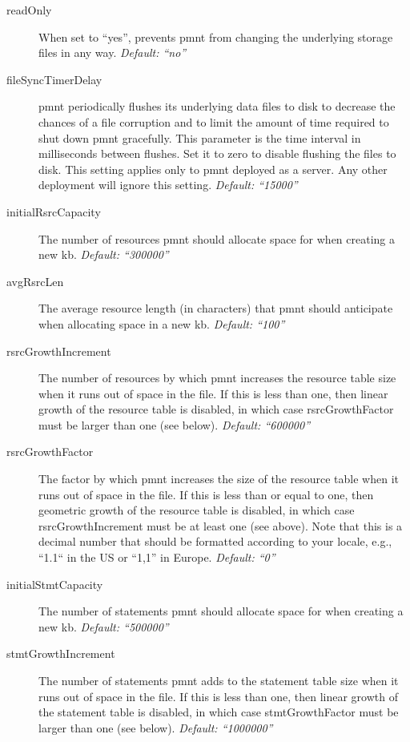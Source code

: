 \begin{description}
	\item[readOnly] When set to ``yes'', prevents \ac{pmnt} from changing the underlying storage files in any way. \emph{Default: ``no''}

	\item[fileSyncTimerDelay] \ac{pmnt} periodically flushes its underlying data files to disk to decrease the chances of a file corruption and to limit the amount of time required to shut down \ac{pmnt} gracefully.  This parameter is the time interval in milliseconds between flushes.  Set it to zero to disable flushing the files to disk.  This setting applies only to \ac{pmnt} deployed as a server.  Any other deployment will ignore this setting. \emph{Default: ``15000''}

	\item[initialRsrcCapacity] The number of resources \ac{pmnt} should allocate space for when creating a new \ac{kb}. \emph{Default: ``300000''}

	\item[avgRsrcLen] The average resource length (in characters) that \ac{pmnt} should anticipate when allocating space in a new \ac{kb}. \emph{Default: ``100''}

	\item[rsrcGrowthIncrement] The number of resources by which \ac{pmnt} increases the resource table size when it runs out of space in the file.  If this is less than one, then linear growth of the resource table is disabled, in which case rsrcGrowthFactor must be larger than one (see below). \emph{Default: ``600000''}

	\item[rsrcGrowthFactor] The factor by which \ac{pmnt} increases the size of the resource table when it runs out of space in the file.  If this is less than or equal to one, then geometric growth of the resource table is disabled, in which case rsrcGrowthIncrement must be at least one (see above).  Note that this is a decimal number that should be formatted according to your locale, e.g., ``1.1`` in the US or ``1,1'' in Europe. \emph{Default: ``0''}

	\item[initialStmtCapacity] The number of statements \ac{pmnt} should allocate space for when creating a new \ac{kb}. \emph{Default: ``500000''}

	\item[stmtGrowthIncrement] The number of statements \ac{pmnt} adds to the statement table size when it runs out of space in the file.  If this is less than one, then linear growth of the statement table is disabled, in which case stmtGrowthFactor must be larger than one (see below). \emph{Default: ``1000000''}


\end{description}

